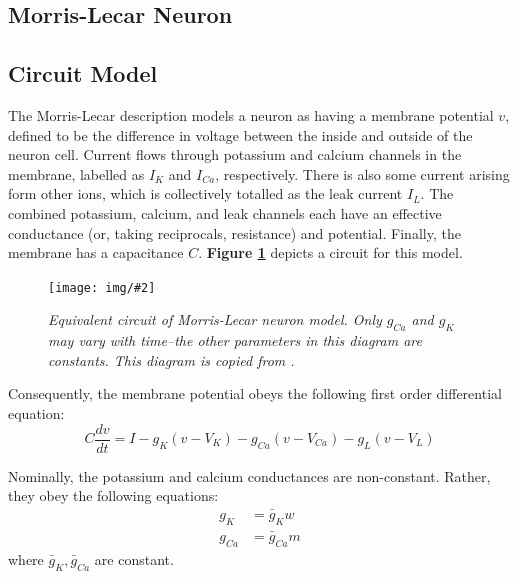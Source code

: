 \documentclass[letterpaper,12pt]{article}
\numberwithin{table}{section}
\numberwithin{figure}{section}
\numberwithin{equation}{section}
\newcommand*{\deriv}[2]{\frac{d #1}{d #2}}
\newcommand{\centerfig}[2]{\begin{center}\texttt{[image: img/\#2]}\end{center}}
\newcommand{\ccaption}[1]{\caption{\textit{#1}}}
\newcommand{\reffig}[1]{\textbf{Figure \ref{#1}}}
\begin{document}
\begin{flushleft}
    \pagebreak

    \section{Morris-Lecar Neuron}
    
    \subsection{Circuit Model}

    The Morris-Lecar description \cite{ml} models a neuron as having a membrane potential $v$, defined to be the difference in voltage between the inside and outside of the neuron cell. Current flows through potassium and calcium channels in the membrane, labelled as $I_K$ and $I_{Ca}$, respectively. There is also some current arising form other ions, which is collectively totalled as the leak current $I_L$. The combined potassium, calcium, and leak channels each have an effective conductance (or, taking reciprocals, resistance) and potential. Finally, the membrane has a capacitance $C$. \reffig{fig:ml-circuit} depicts a circuit for this model.

    \begin{figure}[h]

        \centering
    
        \centerfig{0.6}{ml-circuit.jpg}

        \captionsetup{width=0.8\linewidth}
        \ccaption{Equivalent circuit of Morris-Lecar neuron model. Only $g_{Ca}$ and $g_K$ may vary with time--the other parameters in this diagram are constants. This diagram is copied from \cite{ml}.}
        \label{fig:ml-circuit}
    
    \end{figure}

    Consequently, the membrane potential obeys the following first order differential equation:
    \begin{equation}
        C\deriv{v}{t} = I - g_K (v - V_K) - g_{Ca} (v - V_{Ca}) - g_L (v - V_L)
        \label{eqn:ml-circuit}
    \end{equation}

    Nominally, the potassium and calcium conductances are non-constant. Rather, they obey the following equations:
    \begin{align}
        g_K &= \bar{g}_K w \\
        g_{Ca} &= \bar{g}_{Ca} m
    \end{align}
    where $\bar{g}_K, \bar{g}_{Ca}$ are constant.
    

\end{flushleft}
\end{document}
